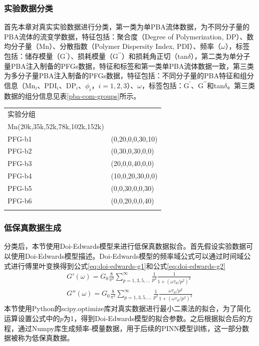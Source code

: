 \subsubsection{实验数据分类}
首先本章对真实实验数据进行分类，第一类为单PBA流体数据，为不同分子量的PBA流体的流变学数据，特征包括：聚合度（Degree of Polymerization, DP）、数均分子量（Mn）、分散指数（Polymer Dispersity Index, PDI）、频率（$\omega$），标签包括：储存模量（$\mathrm{G^{\prime}}$）、损耗模量（$\mathrm{G^{\prime\prime}}$）和损耗角正切（tan$\delta$），第二类为单分子量PBA注入制备的PFGs数据，特征和标签和第一类单PBA流体数据一致，第三类为多分子量PBA注入制备的PFGs数据，特征包括：不同分子量的PBA特征和组分信息（Mn$_i$、PDI$_i$、DP$_i$、$\phi_i$，$i=1,2,3$）、$\omega$，标签包括：$\mathrm{G^{\prime}}$、$\mathrm{G^{\prime\prime}}$和tan$\delta$。第三类数据的组分信息见表\ref{pba-com-groups}所示。
\begin{table}
  \centering
  \small
  \begin{tabularx}{\textwidth}{>{\centering\arraybackslash}X >{\centering\arraybackslash}X} %
    \Xhline{1.5pt}
    实验分组   & \makecell{
      \begin{tabular}{@{}c@{}}
        $\phi_{PBA}(\%)$ \\
        \Xhline{0.5pt}
        Mn(20k,35k,52k,78k,102k,152k)
      \end{tabular}
    }                         \\
    \Xhline{0.5pt}
    PFG-b1 & (0,20,0,0,30,10) \\
    PFG-b2 & (0,30,0,30,0,0)  \\
    PFG-b3 & (20,0,0,40,0,0)  \\
    PFG-b4 & (10,0,20,30,0,0) \\
    PFG-b5 & (0,0,30,0,0,30)  \\
    PFG-b6 & (0,0,20,0,0,40)  \\
    \Xhline{1.5pt}
  \end{tabularx}
\end{table}
\subsubsection{低保真数据生成}
分类后，本节使用Doi-Edwards模型来进行低保真数据拟合。首先假设实验数据可以使用Doi-Edwards模型描述。Doi-Edwards模型的频率域公式可以通过时间域公式进行傅里叶变换得到公式\eqref{eq:doi-edwards-g1}和公式\eqref{eq:doi-edwards-g2}
\begin{align}
  G'(\omega) = G_0 \frac{8}{\pi^2} \sum_{p=1,3,5,\ldots}^{\infty} \frac{1}{p^2} \frac{1}{1 + (\omega \tau_d / p^2)^2} \label{eq:doi-edwards-g1} \\
  G''(\omega) = G_0 \frac{8}{\pi^2} \sum_{p=1,3,5,\ldots}^{\infty} \frac{1}{p^2} \frac{\omega \tau_d / p^2}{1 + (\omega \tau_d / p^2)^2}
  \label{eq:doi-edwards-g2}
\end{align}
本节使用Python的scipy.optimize库对真实数据进行最小二乘法的拟合，为了简化运算设置公式中的$p$为1，得到Doi-Edwards模型的拟合参数。之后根据拟合后的方程，通过Numpy库生成频率-模量数据，用于后续的PINN模型训练，这一部分数据被称为低保真数据。

